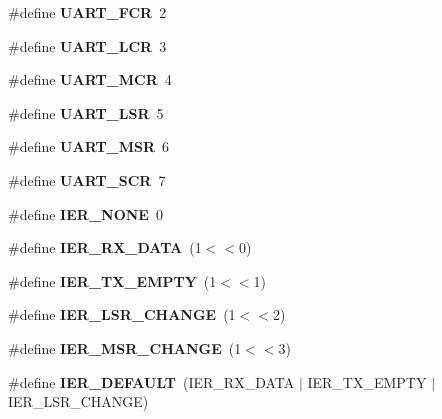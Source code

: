 \begin{DoxyCompactItemize}
\#define {\bfseries U\+A\+R\+T\+\_\+\+F\+CR}~2
\item 
\mbox{\label{group__hal__dos_ga36c30861e332468c7f1998648e706740}} 
\#define {\bfseries U\+A\+R\+T\+\_\+\+L\+CR}~3
\item 
\mbox{\label{group__hal__dos_ga8ef39bc0942ddd0411d87001d12224f4}} 
\#define {\bfseries U\+A\+R\+T\+\_\+\+M\+CR}~4
\item 
\mbox{\label{group__hal__dos_ga0f8ac527073d763bac90daba987361c6}} 
\#define {\bfseries U\+A\+R\+T\+\_\+\+L\+SR}~5
\item 
\mbox{\label{group__hal__dos_ga71067c48bdde7dc6c5d0a1c56746e776}} 
\#define {\bfseries U\+A\+R\+T\+\_\+\+M\+SR}~6
\item 
\mbox{\label{group__hal__dos_ga0aca402a154875f36d38e4ebc5c8f043}} 
\#define {\bfseries U\+A\+R\+T\+\_\+\+S\+CR}~7
\item 
\mbox{\label{group__hal__dos_ga2c43b3d54061de2d1a40c11a0dc36d99}} 
\#define {\bfseries I\+E\+R\+\_\+\+N\+O\+NE}~0
\item 
\mbox{\label{group__hal__dos_ga06339c8fac453ce9078d90d59d1d5833}} 
\#define {\bfseries I\+E\+R\+\_\+\+R\+X\+\_\+\+D\+A\+TA}~(1$<$$<$0)
\item 
\mbox{\label{group__hal__dos_ga3b5355c5845bf4e5f9900dae4977fc65}} 
\#define {\bfseries I\+E\+R\+\_\+\+T\+X\+\_\+\+E\+M\+P\+TY}~(1$<$$<$1)
\item 
\mbox{\label{group__hal__dos_ga8fdda855b9a7ec12dccdb44f0e985af5}} 
\#define {\bfseries I\+E\+R\+\_\+\+L\+S\+R\+\_\+\+C\+H\+A\+N\+GE}~(1$<$$<$2)
\item 
\mbox{\label{group__hal__dos_gaf722d4c4e6617d62b6a2ea4f8fcdc7a3}} 
\#define {\bfseries I\+E\+R\+\_\+\+M\+S\+R\+\_\+\+C\+H\+A\+N\+GE}~(1$<$$<$3)
\item 
\mbox{\label{group__hal__dos_ga90f46b37cc5f1208e83a0a027e83f2c8}} 
\#define {\bfseries I\+E\+R\+\_\+\+D\+E\+F\+A\+U\+LT}~(I\+E\+R\+\_\+\+R\+X\+\_\+\+D\+A\+TA $\vert$ I\+E\+R\+\_\+\+T\+X\+\_\+\+E\+M\+P\+TY $\vert$ I\+E\+R\+\_\+\+L\+S\+R\+\_\+\+C\+H\+A\+N\+GE)

\end{DoxyCompactItemize}
